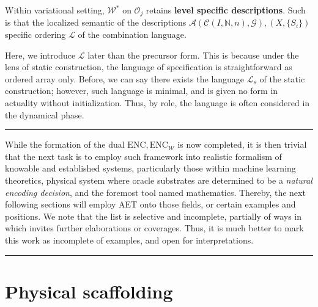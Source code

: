 \begin{observation}
	Within variational setting, $\mathcal{W}^{*}$ on $\mathcal{O}_{j}$ retains \textbf{level specific descriptions}. Such is that the localized semantic of the descriptions $\mathcal{A}(\mathcal{C}(I,\mathbb{N},n),\mathcal{G}),(X,\{S_{i}\})$ specific ordering $\mathcal{L}$ of the combination language. 
\end{observation}

Here, we introduce $\mathcal{L}$ later than the precursor form. This is because under the lens of static construction, the language of specification is straightforward as ordered array only. Before, we can say there exists the language $\mathcal{L}_{s}$ of the static construction; however, such language is minimal, and is given no form in actuality without initialization. Thus, by role, the language is often considered in the dynamical phase. 

\noindent\rule{\linewidth}{1pt}

While the formation of the dual $\mathrm{ENC},\mathrm{ENC}_{\mathcal{W}}$ is now completed, it is then trivial that the next task is to employ such framework into realistic formalism of knowable and established systems, particularly those within machine learning theoretics, physical system where oracle substrates are determined to be a \textit{natural encoding decision}, and the foremost tool named mathematics. Thereby, the next following sections will employ AET onto those fields, or certain examples and positions. We note that the list is selective and incomplete, partially of ways in which invites further elaborations or coverages. Thus, it is much better to mark this work as incomplete of examples, and open for interpretations. 

\noindent\rule{\linewidth}{1pt}

\section{Physical scaffolding}
